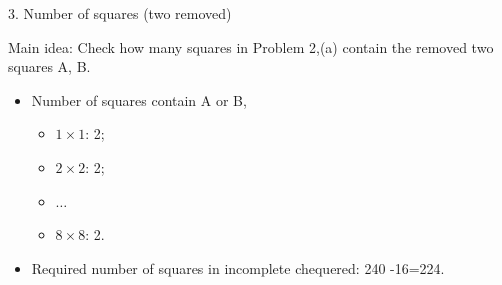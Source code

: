 \documentclass{beamer}
\begin{document}
\begin{frame}{3. Number of squares (two removed)}
  \begin{figure}
  \end{figure}
  Main idea: Check how many squares in Problem 2,(a) contain the removed two squares A, B.
  \begin{itemize}
    \item Number of squares contain A or B,
          \begin{itemize}
            \item $1\times 1$: 2;
            \item $2\times 2$: 2;
            \item $\ldots$
            \item $8\times 8$: 2.
          \end{itemize}
    \item Required number of squares in incomplete chequered: 240 -16=224.       
  \end{itemize}

   
\end{frame}
\end{document}
